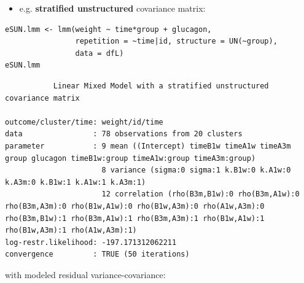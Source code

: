 \documentclass[12pt]{article}
\begin{document}
\clearpage

\begin{itemize}
\item e.g. \textbf{stratified unstructured} covariance matrix:
\end{itemize}
\lstset{language=r,label= ,caption= ,captionpos=b,numbers=none}
\begin{lstlisting}
eSUN.lmm <- lmm(weight ~ time*group + glucagon,
                repetition = ~time|id, structure = UN(~group),
                data = dfL)
eSUN.lmm
\end{lstlisting}
\begin{verbatim}
	       Linear Mixed Model with a stratified unstructured covariance matrix 

outcome/cluster/time: weight/id/time 
data                : 78 observations from 20 clusters 
parameter           : 9 mean ((Intercept) timeB1w timeA1w timeA3m group glucagon timeB1w:group timeA1w:group timeA3m:group) 
                      8 variance (sigma:0 sigma:1 k.B1w:0 k.A1w:0 k.A3m:0 k.B1w:1 k.A1w:1 k.A3m:1) 
                      12 correlation (rho(B3m,B1w):0 rho(B3m,A1w):0 rho(B3m,A3m):0 rho(B1w,A1w):0 rho(B1w,A3m):0 rho(A1w,A3m):0 rho(B3m,B1w):1 rho(B3m,A1w):1 rho(B3m,A3m):1 rho(B1w,A1w):1 rho(B1w,A3m):1 rho(A1w,A3m):1) 
log-restr.likelihood: -197.171312062211 
convergence         : TRUE (50 iterations)
\end{verbatim}



with modeled residual variance-covariance:

\bigskip
\end{document}
